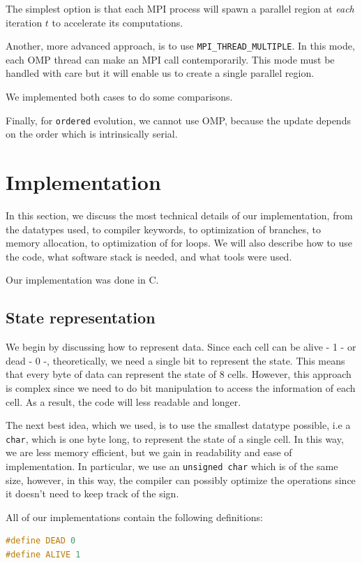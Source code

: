 \documentclass{report}
\begin{document}
The simplest option is that each MPI process will spawn a parallel region at 
\textit{each} iteration $t$ to accelerate its computations.

Another, more advanced approach, is to use \texttt{MPI\_THREAD\_MULTIPLE}. In 
this mode, each OMP thread can make an MPI call contemporarily. This mode must 
be handled with care but it will enable us to create a single parallel
region.

We implemented both cases to do some comparisons. 

Finally, for \texttt{ordered} evolution, we cannot use OMP, because the update 
depends on the order which is intrinsically serial.

\section{Implementation}

In this section, we discuss the most technical details of our implementation, 
from the datatypes used, to compiler keywords, to optimization of branches, to 
memory allocation, to optimization of for loops. We will also describe how to 
use the code, what software stack is needed, and what tools were used.

Our implementation was done in C. 

\subsection{State representation}

We begin by discussing how to represent data. Since each cell can be alive - 1 -
or dead - 0 -, theoretically, we need a single bit to represent the state. This 
means that every byte of data can represent the state of 8 cells. However, 
this approach is complex since we need to do bit manipulation to 
access the information of each cell. As a result, the code will less 
readable and longer. 

The next best idea, which we used, is to use the smallest datatype possible, 
i.e a \texttt{char}, which is one byte long, to represent the state of a single cell.
In this way, we are less memory efficient, but we gain in readability and ease 
of implementation. In particular, we use an \texttt{unsigned char} which 
is of the same size, however, in this way, the compiler can possibly optimize 
the operations since it doesn't need to keep track of the sign.

All of our implementations contain the following definitions:
\begin{lstlisting}[language=C++]
#define DEAD 0 
#define ALIVE 1
\end{lstlisting}
\end{document}
